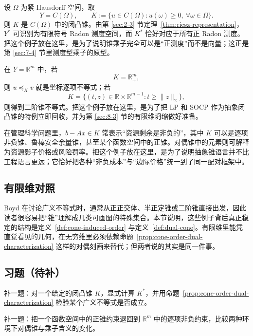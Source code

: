 \begin{example}[正函数锥与正测度锥]\label{ex:positive-cone-measure-space}
设 $\Omega$ 为紧 Hausdorff 空间，取
\[
Y=C(\Omega),\qquad K:=\{u\in C(\Omega):u(\omega)\ge 0,\ \forall \omega\in \Omega\}.
\]
则 $K$ 是 $C(\Omega)$ 中的闭凸锥。由第 \ref{sec:2-3} 节定理~\ref{thm:riesz-representation}，$Y^\ast$ 可识别为有限符号 Radon 测度空间，而 $K^\ast$ 恰好对应于所有正 Radon 测度。把这个例子放在这里，是为了说明锥乘子完全可以是“正测度”而不是向量；这正是第 \ref{sec:7-4} 节里测度型乘子的原型。
\end{example}

\begin{example}[非负正交体与二阶锥]
在 $Y=\mathbb R^m$ 中，若
\[
K=\mathbb R_+^m,
\]
则 $u\preceq_K v$ 就是坐标逐项不等式；若
\[
K=\{(t,z)\in \mathbb R\times \mathbb R^{m-1}:t\ge \|z\|_2\},
\]
则得到二阶锥不等式。把这个例子放在这里，是为了把 LP 和 SOCP 作为抽象闭凸锥的特例立即回收，并为第 \ref{sec:8-3} 节的有限维坍缩做好准备。
\end{example}

\begin{example}[资源非负约束与影子价格]
在管理科学问题里，$b-Ax\in K$ 常表示“资源剩余是非负的”，其中 $K$ 可以是逐项非负锥、鲁棒安全余量锥，甚至某个函数空间中的正锥。对偶锥中的元素则可解释为资源影子价格或风险罚率。把这个例子放在这里，是为了说明抽象锥语言并不比工程语言更远；它恰好把各种“非负成本”与“边际价格”统一到了同一配对框架中。
\end{example}

\subsection*{有限维对照}

Boyd 在讨论广义不等式时，通常从正正交体、半正定锥或二阶锥直接出发，因此读者很容易把“锥”理解成几类可画图的特殊集合。本节说明，这些例子背后真正稳定的结构是定义~\ref{def:cone-induced-order} 与定义~\ref{def:dual-cone}。有限维里能凭直觉看见的几何，在无穷维里必须依赖命题~\ref{prop:cone-order-dual-characterization} 这样的对偶刻画来替代；但两者说的其实是同一件事。

\subsection*{习题（待补）}

\begin{exercise}[对偶锥检验占位]
补一题：对一个给定的闭凸锥 $K$，显式计算 $K^\ast$，并用命题~\ref{prop:cone-order-dual-characterization} 检验某个广义不等式是否成立。
\end{exercise}

\begin{exercise}[锥约束桥接题占位]
补一题：把一个函数空间中的正锥约束退回到 $\mathbb R^m$ 中的逐项非负约束，比较两种环境下对偶锥与乘子含义的变化。
\end{exercise}
